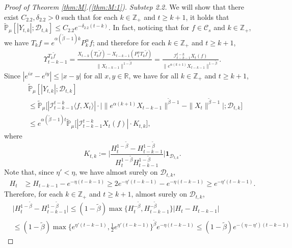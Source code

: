 \documentclass[12pt,a4paper]{amsart}
\theoremstyle{plain}
\theoremstyle{definition}
\numberwithin{equation}{section}
\begin{document}
\begin{proof}[Proof of Theorem \ref{thm:M}.(\ref{thm:M:1})]
  \emph{Substep 2.2.} We will show that there exist $C_{2.2},\delta_{2.2} > 0$ such that for each $k\in \mathbb Z_+$ and $t\geq k+1$, it holds that
\(
    \mathbb{\widetilde{P}}_{\mu}[|Y_{t,k}|;\mathcal{D}_{t,k}]
    \leq  C_{2.2} e^{-\delta_{2.2} (t-k)}.
\)
  In fact, noticing that for $f\in \mathcal C_s$ and $k\in \mathbb Z_+$, we have $T_kf = e^{\alpha (\tilde \beta - 1 )k}P_k^\alpha f $; and therefore for each $k\in \mathbb Z_+$ and $t \geq k + 1$,
 \begin{align}
\label{eq:gammafunction11}
    \Upsilon_{t-k-1}^{T_{k} \tilde f}
    = \frac{X_{t-k}(T_{k} \tilde  f) - X_{t -k-1}(P_1^\alpha T_{k} \tilde f)}{\|X_{t-k-1}\|^{1-\tilde \beta}}
    = \frac{\mathcal I_{t - k - 1}^{t - k} X_t(f)}{\|e^{\alpha (k+1)}X_{t-k-1} \|^{1 -\tilde \beta}}.
\end{align}
  Since $|e^{ix}-e^{iy}|\leq|x-y|$ for all $x,y\in \mathbb R$, we have for all $k \in \mathbb Z_+$ and $t\geq k+1$,
  \begin{align}
    \label{eq: control of Ykt}
    & \mathbb{\widetilde{P}}_{\mu}[|Y_{t,k}|;\mathcal{D}_{t,k}] \\
    & \leq \mathbb{\widetilde{P}}_{\mu}\Big[|\mathcal I_{t-k-1}^{t-k}\langle f , X_t\rangle | \cdot \Big| \| e^{\alpha(k+1)}X_{t-k-1}\| ^{ \tilde \beta - 1} - \|X_t\|^{ \tilde \beta - 1}\Big|; \mathcal D_{t,k}\Big] \\
    & \leq  e^{\alpha(\tilde \beta - 1)t}\mathbb{\widetilde{P}}_{\mu}\big[|\mathcal I_{t-k-1}^{t-k}X_t(f)|\cdot K_{t,k}\big],
  \end{align}
  where
\[
K_{t,k}
    := \Big| \frac {H_t^{1- \tilde \beta} - H_{t-k-1}^{1 - \tilde \beta}} {H_t^{1 - \tilde \beta} H_{t-k-1}^{ 1- \tilde \beta }} \Big| \mathbf{1}_{\mathcal{D}_{t,k}}.
\]
Note that, since $\eta' < \eta$, we have almost surely on $\mathcal D_{t,k}$,
  \begin{align}
    H_t
    & \geq H_{t-k-1}- e^{-\eta (t-k-1)}
      \geq 2e^{-\eta'(t-k-1)}-e^{-\eta(t-k-1)}
      \geq e^{-\eta'(t-k-1)}.
  \end{align}
  Therefore, for each $k \in \mathbb Z_+$ and $t\geq k+1$, almost surely  on $\mathcal D_{t,k}$,
  \begin{align}
    & \Big|H_t^{1- \tilde \beta}-H_{t-k-1}^{1- \tilde \beta}\Big|
      \leq (1- \tilde \beta) \max \{ H_t^{-\tilde \beta }, H_{t-k-1}^{ -\tilde \beta} \} | H_t - H_{t-k-1} | \\
    & \leq (1- \tilde \beta ) \max\{e^{\eta' (t-k-1)}, \frac{1}{2}e^{\eta'(t-k-1)}\}^{\tilde \beta} e^{-\eta(t-k-1)}  \leq (1- \tilde \beta) e^{-(\eta - \eta') (t-k-1)}

\end{align}
\end{proof}
\end{document}
